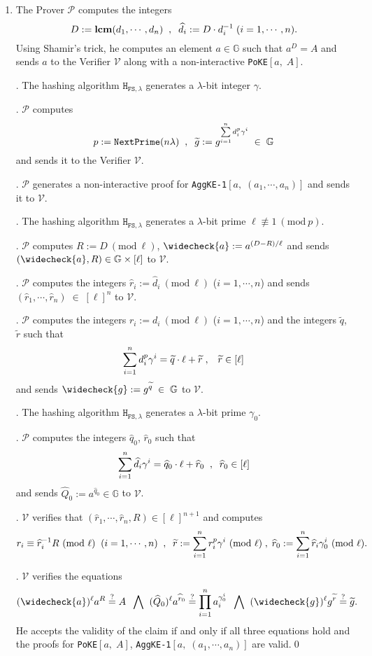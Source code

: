 \documentclass[11pt, lettersize, notitlepage, leqno, footskip=0.6cm]{article}
\newcommand{\pl}{\prod\limits}
\newcommand{\slim}{\sum\limits}
\newcommand{\ttt}{\texttt}
\newcommand{\bG}{\mathbb{G}}
\newcommand{\wti}{\widetilde}
\newcommand{\mc}{\mathcal}
\newcommand{\mb}{\mathbb}
\newcommand{\mbf}{\mathbf}
\newcommand{\lam}{\lambda}
\newcommand{\what}{\widehat}
\newcommand{\weck}{\widecheck}
\newcommand{\vs}{\vspace{-0.15cm}}
\newcommand{\noin}{\noindent}
\newcommand{\sta}{\stackrel{?}{=}}
\newcommand{\Mod}[1]{\ (\mathrm{mod}\ #1)}
\newcommand{\LCM}{\mbf{lcm}}
\numberwithin{equation}{section}
\begin{document}
\begin{enumerate}[wide, labelwidth=!, labelindent=0pt]\vs \item The Prover $\mc{P}$ computes the integers \vs $$D:= \LCM(d_1,\cdots,d_n)\;\;,\;\;\what{d}_i:= D\cdot d_i^{-1}\;(i=1,\cdots,n). \vs $$ Using Shamir's trick, he computes an element $a\in\mb{G}$ such that $a^D = A$ and sends $a$ to the Verifier $\mc{V}$ along with a non-interactive \verb|PoKE|$[a,\;A]$.

\noin 2. The hashing algorithm $\ttt{H}_{\ttt{FS},\lam}$ generates a $\lam$-bit integer $\gamma$.

\noin 3. $\mc{P}$ computes \vs $$p:= \ttt{NextPrime}(n\lam)\;\;,\;\;\wti{g} := g^{\slim_{i=1}^n d_i^{p}\gamma^i}\;\in\;\bG\vs $$ and sends it to the Verifier $\mc{V}$. 

\noin 4. $\mc{P}$ generates a non-interactive proof for \verb|AggKE-1|$[a,\;(a_1,\cdots,a_n)]$ and sends it to $\mc{V}$.

\noin 5. The hashing algorithm $\ttt{H}_{\ttt{FS},\lam}$ generates a $\lam$-bit prime $\ell\not\equiv 1\Mod{p}$.

\noin 6. $\mc{P}$ computes $R:= D\Mod{\ell}$, $\weck{a}:= a^{(D-R)/\ell}$ and sends $(\weck{a}, R)\in \bG\times [\ell]$ to $\mc{V}$.

\noin 7. $\mc{P}$ computes the integers $\what{r}_i:= \what{d}_i\Mod{\ell}$ ($i=1,\cdots,n$) and sends $(\what{r}_1,\cdots,\what{r}_n)\;\in\;[\ell]^n$ to $\mc{V}$.

\noin 8. $\mc{P}$ computes the integers ${r}_i:= {d}_i\Mod{\ell}$ ($i=1,\cdots,n$) and the integers $\wti{q}$, $\wti{r}$ such that \vs $$\slim_{i=1}^n {d}_i^{p}\gamma^i = \wti{q} \cdot \ell+\wti{r}\;,\;\;\;\wti{r}\in[\ell] \vs $$ and sends $\weck{g}:= g^{\wti{q}}\;\in\;\bG$ to $\mc{V}$.

\noin 9. The hashing algorithm $\ttt{H}_{\ttt{FS},\lam}$ generates a $\lam$-bit prime $\gamma_{0}$.

\noin 10. $\mc{P}$ computes the integers $\what{q}_0$, $\what{r}_0$ such that \vs $$\slim_{i=1}^n \what{d}_i\gamma^i = \what{q}_0 \cdot \ell+\what{r}_0\;\;,\;\;\what{r}_0\in[\ell] \vs $$ and sends $\what{Q}_0:= a^{\what{q}_0}\in \bG$ to $\mc{V}$.

\noin 11. $\mc{V}$ verifies that $(\what{r}_1,\cdots,\what{r}_n, R)\in [\ell]^{n+1}$ and computes \vs $$r_i\equiv \what{r}_i^{-1}R\Mod{\ell}\;\; (i=1,\cdots,n)\;\;,\;\;\wti{r}:= {\slim_{i=1}^n r_i^{p}\gamma^i}\Mod{\ell}\;,\; \what{r}_0:= \slim_{i=1}^n \what{r}_i\gamma_{0}^i\Mod{\ell}. \vs $$

\noin 12. $\mc{V}$ verifies the equations \vspace{-0.25cm} $$(\weck{a})^{\ell}a^R\sta A \; \;\bigwedge\;\;(\what{Q}_0)^{\ell}a^{\what{r}_0}\sta \pl_{i=1}^{n} a_i^{\gamma_{0}^i} \;\;\bigwedge\;\; (\weck{g})^{\ell}g^{\wti{r}} \sta \wti{g}.\vs $$ He accepts the validity of the claim if and only if all three equations hold and the proofs for \verb|PoKE|$[a,\;A]$, \verb|AggKE-1|$[a,\;(a_1,\cdots,a_n)]$ are valid.\qed \end{enumerate}
\end{document}
